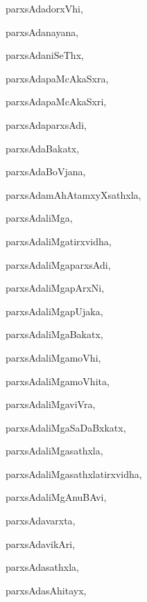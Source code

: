 \begin{multicols}{3}
{\noindent
{parxsAdadorxVhi}, \pageref{parxsAdadorxVhi}

\noindent
{parxsAdanayana}, \pageref{parxsAdanayana}

\noindent
{parxsAdaniSeThx}, \pageref{parxsAdaniSeThx}

\noindent
{parxsAdapaMcAkaSxra}, \pageref{parxsAdapaMcAkaSxra}

\noindent
{parxsAdapaMcAkaSxri}, \pageref{parxsAdapaMcAkaSxri}

\noindent
{parxsAdaparxsAdi}, \pageref{parxsAdaparxsAdi}

\noindent
{parxsAdaBakatx}, \pageref{parxsAdaBakatx}

\noindent
{parxsAdaBoVjana}, \pageref{parxsAdaBoVjana}

\noindent
{parxsAdamAhAtamxyXsathxla}, \pageref{parxsAdamAhAtamxyXsathxla}

\noindent
{parxsAdaliMga}, \pageref{parxsAdaliMga}

\noindent
{parxsAdaliMgatirxvidha}, \pageref{parxsAdaliMgatirxvidha}

\noindent
{parxsAdaliMgaparxsAdi}, \pageref{parxsAdaliMgaparxsAdi}

\noindent
{parxsAdaliMgapArxNi}, \pageref{parxsAdaliMgapArxNi}

\noindent
{parxsAdaliMgapUjaka}, \pageref{parxsAdaliMgapUjaka}

\noindent
{parxsAdaliMgaBakatx}, \pageref{parxsAdaliMgaBakatx}

\noindent
{parxsAdaliMgamoVhi}, \pageref{parxsAdaliMgamoVhi}

\noindent
{parxsAdaliMgamoVhita}, \pageref{parxsAdaliMgamoVhita}

\noindent
{parxsAdaliMgaviVra}, \pageref{parxsAdaliMgaviVra}

\noindent
{parxsAdaliMgaSaDaBxkatx}, \pageref{parxsAdaliMgaSaDaBxkatx}

\noindent
{parxsAdaliMgasathxla}, \pageref{parxsAdaliMgasathxla}

\noindent
{parxsAdaliMgasathxlatirxvidha}, \pageref{parxsAdaliMgasathxlatirxvidha}

\noindent
{parxsAdaliMgAnuBAvi}, \pageref{parxsAdaliMgAnuBAvi}

\noindent
{parxsAdavarxta}, \pageref{parxsAdavarxta}

\noindent
{parxsAdavikAri}, \pageref{parxsAdavikAri2}

\noindent
{parxsAdasathxla}, \pageref{parxsAdasathxla}

\noindent
{parxsAdasAhitayx}, \pageref{parxsAdasAhitayx}

}
\end{multicols}
